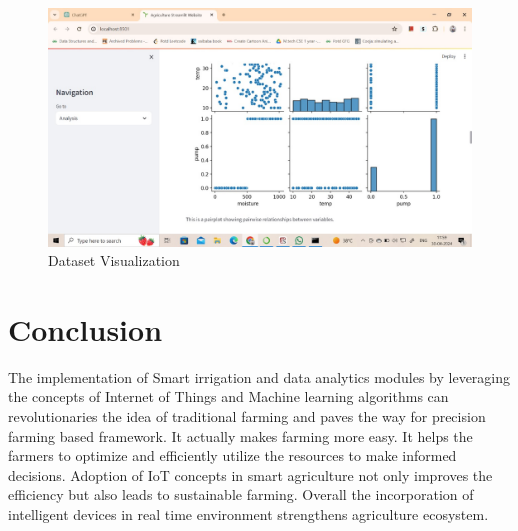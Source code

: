 \documentclass{article}
\begin{document}
\begin{figure}[h]
    \centering
    \includegraphics[width=1.0\textwidth]{dataset_visualization2.jpg}
    \caption{Dataset Visualization}
    \label{fig:example}
\end{figure}
\newpage

\section{Conclusion}

The implementation of Smart irrigation and data analytics modules by leveraging the concepts of Internet of Things and Machine learning algorithms can revolutionaries the idea of traditional farming and paves the way for precision farming based framework. It actually makes farming more easy. It helps the farmers to optimize and efficiently utilize the resources to make informed decisions. Adoption of IoT concepts in smart agriculture not only improves the efficiency but also leads to sustainable farming. Overall the incorporation of intelligent devices in real time environment strengthens agriculture ecosystem.
\end{document}
